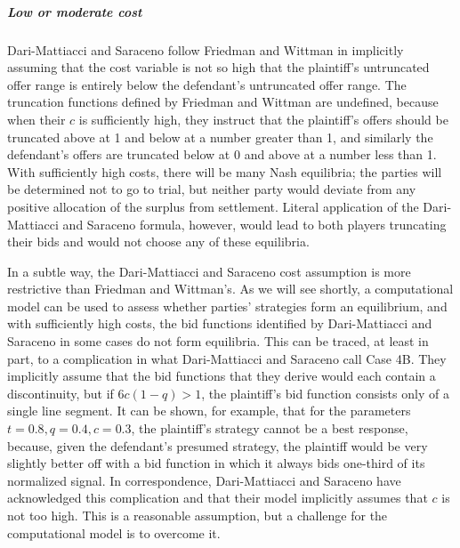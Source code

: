 \documentclass{article}
\begin{document}
\subparagraph{Low or moderate cost}Dari-Mattiacci and Saraceno follow Friedman and Wittman in implicitly assuming that the cost variable is not so high that the plaintiff's untruncated offer range is entirely below the defendant's untruncated offer range. The truncation functions defined by Friedman and Wittman are undefined, because when their $c$ is sufficiently high, they instruct that the plaintiff's offers should be truncated above at 1 and below at a number greater than 1, and similarly the defendant's offers are truncated below at 0 and above at a number less than 1. With sufficiently high costs, there will be many Nash equilibria; the parties will be determined not to go to trial, but neither party would deviate from any positive allocation of the surplus from settlement. Literal application of the Dari-Mattiacci and Saraceno formula, however, would lead to both players truncating their bids and would not choose any of these equilibria.

In a subtle way, the Dari-Mattiacci and Saraceno cost assumption is more restrictive than Friedman and Wittman's. As we will see shortly, a computational model can be used to assess whether parties' strategies form an equilibrium, and with sufficiently high costs, the bid functions identified by Dari-Mattiacci and Saraceno in some cases do not form equilibria. This can be traced, at least in part, to a complication in what Dari-Mattiacci and Saraceno call Case 4B. They implicitly assume that the bid functions that they derive would each contain a discontinuity, but if $6c(1-q) > 1$, the plaintiff's bid function consists only of a single line segment. It can be shown, for example, that for the parameters $t = 0.8, q = 0.4, c = 0.3$, the plaintiff's strategy cannot be a best response, because, given the defendant's presumed strategy, the plaintiff would be very slightly better off with a bid function in which it always bids one-third of its normalized signal. In correspondence, Dari-Mattiacci and Saraceno have acknowledged this complication and that their model implicitly assumes that $c$ is not too high. This is a reasonable assumption, but a challenge for the computational model is to overcome it.
\end{document}
